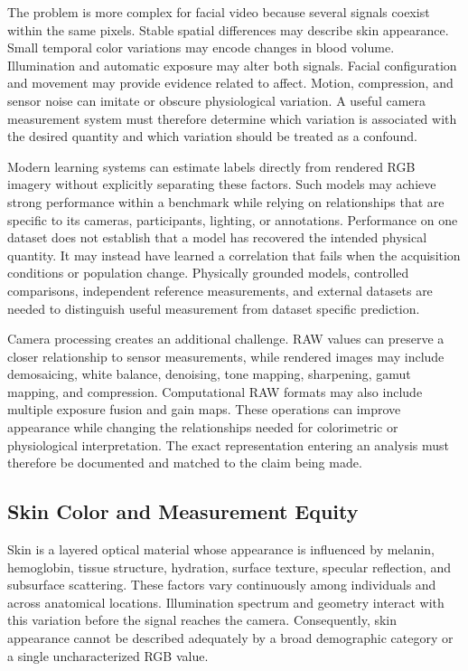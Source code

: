 \documentclass[12pt]{article}
\begin{document}
The problem is more complex for facial video because several signals coexist within the same pixels. Stable spatial differences may describe skin appearance. Small temporal color variations may encode changes in blood volume. Illumination and automatic exposure may alter both signals. Facial configuration and movement may provide evidence related to affect. Motion, compression, and sensor noise can imitate or obscure physiological variation. A useful camera measurement system must therefore determine which variation is associated with the desired quantity and which variation should be treated as a confound.

Modern learning systems can estimate labels directly from rendered RGB imagery without explicitly separating these factors. Such models may achieve strong performance within a benchmark while relying on relationships that are specific to its cameras, participants, lighting, or annotations. Performance on one dataset does not establish that a model has recovered the intended physical quantity. It may instead have learned a correlation that fails when the acquisition conditions or population change. Physically grounded models, controlled comparisons, independent reference measurements, and external datasets are needed to distinguish useful measurement from dataset specific prediction.

Camera processing creates an additional challenge. RAW values can preserve a closer relationship to sensor measurements, while rendered images may include demosaicing, white balance, denoising, tone mapping, sharpening, gamut mapping, and compression. Computational RAW formats may also include multiple exposure fusion and gain maps. These operations can improve appearance while changing the relationships needed for colorimetric or physiological interpretation. The exact representation entering an analysis must therefore be documented and matched to the claim being made.

\subsection{Skin Color and Measurement Equity}

Skin is a layered optical material whose appearance is influenced by melanin, hemoglobin, tissue structure, hydration, surface texture, specular reflection, and subsurface scattering. These factors vary continuously among individuals and across anatomical locations. Illumination spectrum and geometry interact with this variation before the signal reaches the camera. Consequently, skin appearance cannot be described adequately by a broad demographic category or a single uncharacterized RGB value.
\end{document}
